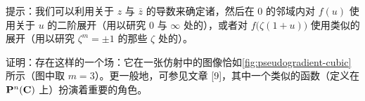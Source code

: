 \begin{exercise}
提示：我们可以利用关于 $z$ 与 $\bar{z}$ 的导数来确定诸\trCriticalPoint，然后在 $0$ 的邻域内对 $f(u)$ 使用关于 $u$ 的二阶\trTaylor{}展开（用以研究 $0$ 与 $\infty$ 处的\trCriticalPoint），或者对 $f\bigl(\zeta(1+u)\bigr)$ 使用类似的展开（用以研究 $\zeta^m=\pm 1$ 的那些 $\zeta$ 处的\trCriticalPoint）。

证明：存在这样的一个\trPseudogradient{}场：它在一张仿射\trChart{}中的图像恰如\cref{fig:pseudogradient-cubic}所示（图中取 $m=3$）。更一般地，可参见文章 [9]，其中一个类似的函数（定义在 $\mathbf{P}^n(\mathbf{C})$ 上）扮演着重要的角色。
\end{exercise}
